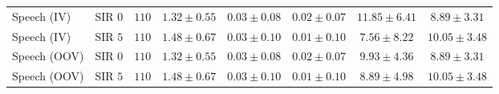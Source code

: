 \begin{table}[t]
{\begin{tabular}{@{}lccccccc@{}}
        Speech (IV)
        & SIR $0$
        & $110$
        & $1.32 \pm 0.55$
        & $0.03 \pm 0.08$
        & $0.02 \pm 0.07$
        & $\mathbf{11.85 \pm 6.41}$
        & $8.89 \pm 3.31$
        \\

        Speech (IV)
        & SIR $5$
        & $110$
        & $1.48 \pm 0.67$
        & $0.03 \pm 0.10$
        & $0.01 \pm 0.10$
        & $7.56 \pm 8.22$
        & $\mathbf{10.05 \pm 3.48}$
        \\

        Speech (OOV)
        & SIR $0$
        & $110$
        & $1.32 \pm 0.55$
        & $0.03 \pm 0.08$
        & $0.02 \pm 0.07$
        & $\mathbf{9.93 \pm 4.36}$
        & $8.89 \pm 3.31$
        \\

        Speech (OOV)
        & SIR $5$
        & $110$
        & $1.48 \pm 0.67$
        & $0.03 \pm 0.10$
        & $0.01 \pm 0.10$
        & $8.89 \pm 4.98$
        & $\mathbf{10.05 \pm 3.48}$
        \\

        \bottomrule
    \end{tabular}%
    }
\end{table}
